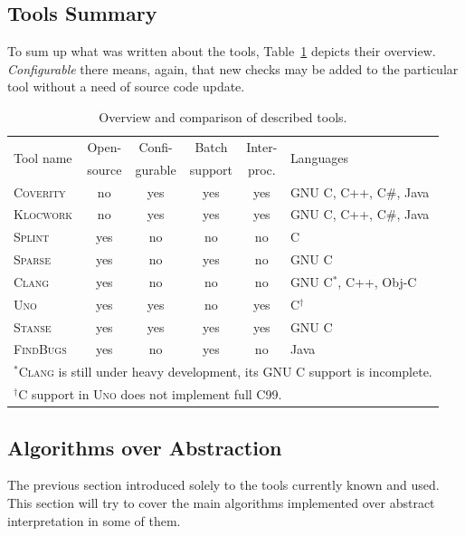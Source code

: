 \documentclass[11pt,a4paper]{article}
\begin{document}
\subsection{Tools Summary}
To sum up what was written about the tools, Table~\ref{fig_static_comp}
depicts their overview. \emph{Configurable} there means, again, that new
checks may be added to the particular tool without a need of source code
update.

\begin{table}[htb]
\begin{center}
\begin{tabular}{l|ccccl}
\multirow{2}{*}{Tool name} &
Open- &
Confi- &
Batch &
Inter- &
\multirow{2}{*}{Languages} \\
		  & source & gurable & support & proc.  & \\ \hline
\textsc{Coverity} & no   & yes     & yes     & yes    & GNU C, C++, C\#, Java \\
\textsc{Klocwork} & no   & yes     & yes     & yes    & GNU C, C++, C\#, Java \\
\textsc{Splint}	  & yes  & no      & no      & no     & C \\
\textsc{Sparse}   & yes  & no      & yes     & no     & GNU C \\
\textsc{Clang}	  & yes  & no      & no      & no     & GNU C$^*$, C++, Obj-C \\
\textsc{Uno}	  & yes  & yes     & no      & yes    & C$^\dagger$ \\
\textsc{Stanse}	  & yes  & yes     & yes     & yes    & GNU C \\
\textsc{FindBugs} & yes  & no      & yes     & no     & Java \\ \hline
\multicolumn{6}{l}{\footnotesize $^*$\textsc{Clang} is still under heavy
development, its GNU C support is incomplete.} \\
\multicolumn{6}{l}{\footnotesize $^\dagger$C support in \textsc{Uno} does not
implement full C99.} \\
\end{tabular}
\caption{Overview and comparison of described tools.}
\label{fig_static_comp}
\end{center}
\end{table}

\subsection{Algorithms over Abstraction}
The previous section introduced solely to the tools currently known and used.
This section will try to cover the main algorithms implemented over abstract
interpretation in some of them.
\end{document}
